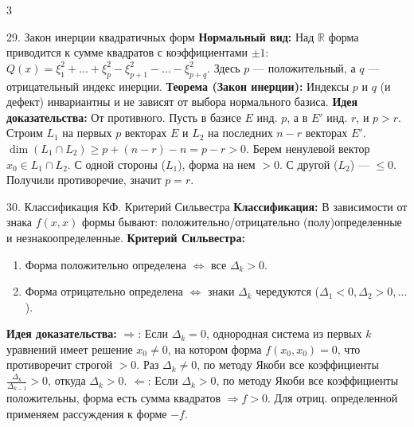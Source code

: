 \documentclass[8pt, a4paper, landscape]{extarticle}
\newcommand{\Ra}{\Rightarrow}
\begin{document}
\begin{multicols*}{3}
\begin{ticket}{29. Закон инерции квадратичных форм}
\textbf{Нормальный вид:} Над $\mathbb{R}$ форма приводится к сумме квадратов с коэффициентами $\pm 1$:
$Q(x) = \xi_1^2 + \dots + \xi_p^2 - \xi_{p+1}^2 - \dots - \xi_{p+q}^2$.
Здесь $p$ --- положительный, а $q$ --- отрицательный индекс инерции.
\tcblower
\textbf{Теорема (Закон инерции):} Индексы $p$ и $q$ (и дефект) инвариантны и не зависят от выбора нормального базиса.
\textbf{Идея доказательства:} От противного. Пусть в базисе $E$ инд. $p$, а в $E'$ инд. $r$, и $p > r$. Строим $L_1$ на первых $p$ векторах $E$ и $L_2$ на последних $n-r$ векторах $E'$. 
$\dim(L_1 \cap L_2) \ge p + (n-r) - n = p - r > 0$. 
Берем ненулевой вектор $x_0 \in L_1 \cap L_2$. С одной стороны ($L_1$), форма на нем $>0$. С другой ($L_2$) --- $\le 0$. Получили противоречие, значит $p = r$.
\end{ticket}

\begin{ticket}{30. Классификация КФ. Критерий Сильвестра}
\textbf{Классификация:} В зависимости от знака $f(x,x)$ формы бывают: 
положительно/отрицательно (полу)определенные и незнакоопределенные.
\tcblower
\textbf{Критерий Сильвестра:} 
\begin{enumerate}
    \item Форма положительно определена $\Leftrightarrow$ все $\Delta_k > 0$.
    \item Форма отрицательно определена $\Leftrightarrow$ знаки $\Delta_k$ чередуются ($\Delta_1 < 0, \Delta_2 > 0, \dots$).
\end{enumerate}
\textbf{Идея доказательства:} $\Rightarrow$: Если $\Delta_k = 0$, однородная система из первых $k$ уравнений имеет решение $x_0 \neq 0$, на котором форма $f(x_0, x_0) = 0$, что противоречит строгой $>0$. Раз $\Delta_k \neq 0$, по методу Якоби все коэффициенты $\frac{\Delta_k}{\Delta_{k-1}} > 0$, откуда $\Delta_k > 0$.
$\Leftarrow$: Если $\Delta_k > 0$, по методу Якоби все коэффициенты положительны, форма есть сумма квадратов $\Ra f > 0$. Для отриц. определенной применяем рассуждения к форме $-f$.
\end{ticket}


\end{multicols*}
\end{document}
